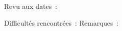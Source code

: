 \documentclass[a4paper,11pt]{report}
\begin{document}
\begin{center}
Revu aux dates~:

Difficultés rencontrées~:
Remarques~:
\end{center}
\end{document}
